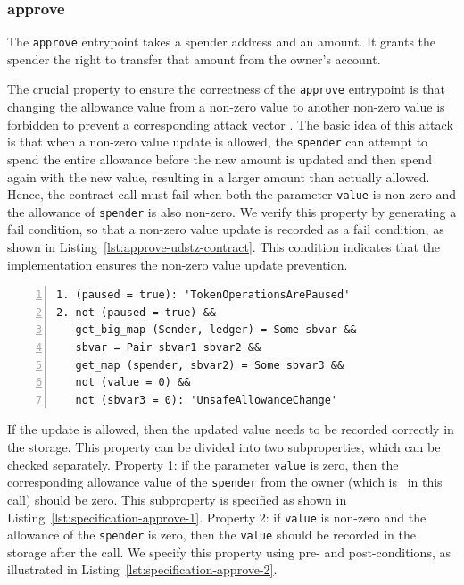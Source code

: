 \documentclass[a4paper,USenglish,cleveref, autoref,anonymous]{lipics-v2021}
\begin{document}
\subsubsection{approve}
\label{sec:approve}

The \texttt{approve} entrypoint takes a spender address and an
amount. It grants the spender the right to transfer that amount from
the owner's account.

The crucial property to ensure the correctness of the \texttt{approve}
entrypoint is that changing the allowance value from a non-zero value
to another non-zero value is forbidden to prevent a corresponding
attack vector \cite{attack-vector}. The basic idea of this attack is
that when a non-zero value update is allowed, the \lstinline/spender/
can attempt to spend the entire allowance before the new amount is
updated and then spend again with the new value, resulting in a larger
amount than actually allowed. Hence, the contract call must fail when
both the parameter \lstinline/value/ is non-zero and the allowance of
\lstinline/spender/ is also non-zero. We verify this property by
generating a fail condition, so that a non-zero value update is
recorded as a fail condition, as shown in
Listing~\ref{lst:approve-udstz-contract}. This condition indicates
that the implementation ensures the non-zero value update prevention. 
\begin{lstlisting}[float=tp,captionpos=b,caption={Fail conditions for the \lstinline/approve/ entrypoint},label={lst:approve-udstz-contract},numbers=left]
1. (paused = true): 'TokenOperationsArePaused'
2. not (paused = true) &&
   get_big_map (Sender, ledger) = Some sbvar &&
   sbvar = Pair sbvar1 sbvar2 &&
   get_map (spender, sbvar2) = Some sbvar3 &&
   not (value = 0) &&
   not (sbvar3 = 0): 'UnsafeAllowanceChange'
\end{lstlisting}
If the update is allowed, then the updated value needs to be recorded
correctly in the storage. This property can be divided into two
subproperties, which can be checked separately. Property 1: if the
parameter \lstinline/value/ is zero, then the 
corresponding allowance value of the \lstinline/spender/ from the
owner (which is \SENDER\ in this call) should be zero. This
subproperty is specified as shown in
Listing~\ref{lst:specification-approve-1}. Property 2: if
\lstinline/value/ is non-zero and the allowance of the \lstinline/spender/ is zero, then the \lstinline/value/ should be recorded in the storage after the call. We specify this property using pre- and post-conditions, as illustrated in Listing~\ref{lst:specification-approve-2}.
\end{document}
